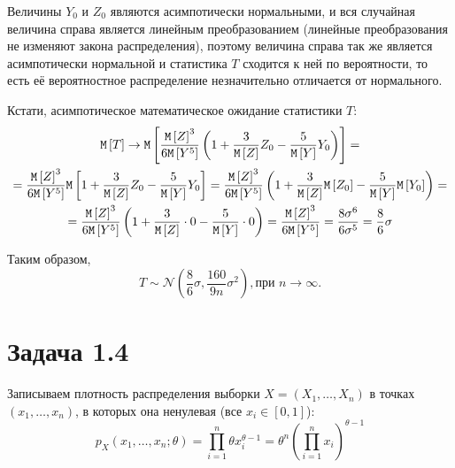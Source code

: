 Величины $Y_0$ и $Z_0$ являются асимпотически нормальными, и вся случайная величина справа является линейным преобразованием (линейные преобразования не изменяют закона
распределения), поэтому величина справа так же является асимпотически нормальной и статистика $T$ сходится к ней по вероятности, то есть её вероятностное распределение
незначительно отличается от нормального.

Кстати, асимпотическое математическое ожидание статистики $T$:
\begin{multline}
    \mathtt{M} \left [ T \right ]
    \rightarrow \mathtt{M} \left [ \frac{\mathtt{M} \left [ Z \right ]^3}{6 \mathtt{M} \left [ Y^5 \right ]} \left ( 1 + \frac{3}{\mathtt{M} \left [ Z \right ]} Z_0 - \frac{5}{\mathtt{M} \left [ Y \right ]} Y_0 \right ) \right ] = \\
    = \frac{\mathtt{M} \left [ Z \right ]^3}{6 \mathtt{M} \left [ Y^5 \right ]} \mathtt{M} \left [ 1 + \frac{3}{\mathtt{M} \left [ Z \right ]} Z_0 - \frac{5}{\mathtt{M} \left [ Y \right ]} Y_0 \right ]
    = \frac{\mathtt{M} \left [ Z \right ]^3}{6 \mathtt{M} \left [ Y^5 \right ]} \left ( 1 + \frac{3}{\mathtt{M} \left [ Z \right ]} \mathtt{M} \left [ Z_0 \right ] - \frac{5}{\mathtt{M} \left [ Y \right ]} \mathtt{M} \left [ Y_0 \right ] \right ) = \\
    = \frac{\mathtt{M} \left [ Z \right ]^3}{6 \mathtt{M} \left [ Y^5 \right ]} \left ( 1 + \frac{3}{\mathtt{M} \left [ Z \right ]} \cdot 0 - \frac{5}{\mathtt{M} \left [ Y \right ]} \cdot 0 \right )
    = \frac{\mathtt{M} \left [ Z \right ]^3}{6 \mathtt{M} \left [ Y^5 \right ]}
    = \frac{8 \sigma^6}{6 \sigma^5}
    = \frac{8}{6} \sigma
\end{multline}

Таким образом,
\begin{equation}
    T \sim \mathcal{N} \left ( \frac{8}{6} \sigma, \frac{160}{9 n} \sigma^2 \right ), \text{при } n \rightarrow \infty.
\end{equation}

\section*{Задача 1.4}

Записываем плотность распределения выборки $X = \left ( X_1, \dots, X_n \right )$ в точках $\left ( x_1, \dots, x_n \right )$,
в которых она ненулевая (все $x_i \in [0, 1]$):
\begin{equation}
    p_X(x_1, \dots, x_n; \theta)
    = \prod_{i=1}^n \theta x_i^{\theta - 1}
    = \theta^n \left ( \prod_{i=1}^n x_i \right )^{\theta - 1}
\end{equation}

